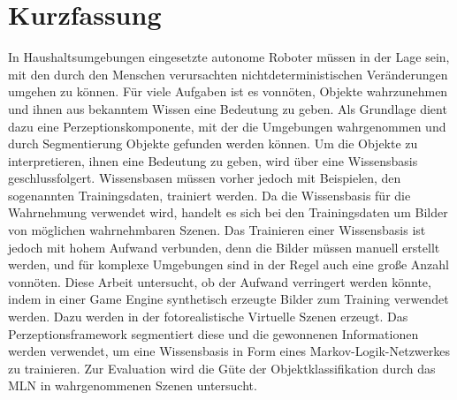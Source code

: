 \chapter*{Kurzfassung} 

In Haushaltsumgebungen eingesetzte autonome Roboter müssen in der Lage sein, mit den durch den Menschen verursachten nichtdeterministischen Veränderungen umgehen zu können. Für viele Aufgaben ist es vonnöten, Objekte wahrzunehmen und ihnen aus bekanntem Wissen eine Bedeutung zu geben. Als Grundlage dient dazu eine Perzeptionskomponente, mit der die Umgebungen wahrgenommen und durch Segmentierung Objekte gefunden werden können. Um die Objekte zu interpretieren, ihnen eine Bedeutung zu geben, wird über eine Wissensbasis geschlussfolgert. Wissensbasen müssen vorher jedoch mit Beispielen, den sogenannten Trainingsdaten, trainiert werden. Da die Wissensbasis für die Wahrnehmung verwendet wird, handelt es sich bei den Trainingsdaten um Bilder von möglichen wahrnehmbaren Szenen. Das Trainieren einer Wissensbasis ist jedoch mit hohem Aufwand verbunden, denn die Bilder müssen manuell erstellt werden, und für komplexe Umgebungen sind in der Regel auch eine große Anzahl vonnöten. Diese Arbeit untersucht, ob der Aufwand verringert werden könnte, indem in einer Game Engine synthetisch erzeugte Bilder zum Training verwendet werden. Dazu werden in der \unreal fotorealistische Virtuelle Szenen erzeugt. Das Perzeptionsframework \robosherlock segmentiert diese und die gewonnenen Informationen werden verwendet, um eine Wissensbasis in Form eines Markov-Logik-Netzwerkes zu trainieren. Zur Evaluation wird die Güte der Objektklassifikation durch das MLN in wahrgenommenen Szenen untersucht. 
